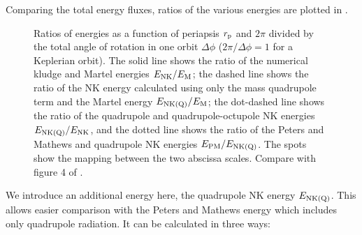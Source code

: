 Comparing the total energy fluxes, ratios of the various energies are plotted in .
\begin{figure}[!htp]
  \begin{center}
    \quad
    \caption{Ratios of energies as a function of periapsis $r_\mathrm{p}$ and $2\pi$ divided by the total angle of rotation in one orbit $\Delta\phi$ ($2\pi/\Delta\phi = 1$ for a Keplerian orbit). The solid line shows the ratio of the numerical kludge and Martel energies $E_\mathrm{NK}/E_\mathrm{M}$; the dashed line shows the ratio of the NK energy calculated using only the mass quadrupole term and the Martel energy $E_\mathrm{NK(Q)}/E_\mathrm{M}$; the dot-dashed line shows the ratio of the quadrupole and quadrupole-octupole NK energies $E_\mathrm{NK(Q)}/E_\mathrm{NK}$, and the dotted line shows the ratio of the Peters and Mathews and quadrupole NK energies $E_\mathrm{PM}/E_\mathrm{NK(Q)}$. The spots show the mapping between the two abscissa scales. Compare with figure 4 of \citet{Gair2005}.\label{fig:Energy_ratio}}
  \end{center}
\end{figure}
We introduce an additional energy here, the quadrupole NK energy $E_\mathrm{NK(Q)}$. This allows easier comparison with the Peters and Mathews energy which includes only quadrupole radiation. It can be calculated in three ways:
